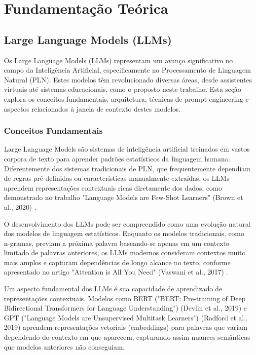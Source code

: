 \documentclass[tcc,capa]{texufpel}
\begin{document}
\chapter{Fundamentação Teórica}

\section{Large Language Models (LLMs)}

Os Large Language Models (LLMs) representam um avanço significativo no campo da Inteligência Artificial, especificamente no Processamento de Linguagem Natural (PLN). Estes modelos têm revolucionado diversas áreas, desde assistentes virtuais até sistemas educacionais, como o proposto neste trabalho. Esta seção explora os conceitos fundamentais, arquitetura, técnicas de prompt engineering e aspectos relacionados à janela de contexto destes modelos.

\subsection{Conceitos Fundamentais}

Large Language Models são sistemas de inteligência artificial treinados em vastos corpora de texto para aprender padrões estatísticos da linguagem humana. Diferentemente dos sistemas tradicionais de PLN, que frequentemente dependiam de regras pré-definidas ou características manualmente extraídas, os LLMs aprendem representações contextuais ricas diretamente dos dados, como demonstrado no trabalho "Language Models are Few-Shot Learners" (Brown et al., 2020) \cite{brown2020language}.

O desenvolvimento dos LLMs pode ser compreendido como uma evolução natural dos modelos de linguagem estatísticos. Enquanto os modelos tradicionais, como n-gramas, previam a próxima palavra baseando-se apenas em um contexto limitado de palavras anteriores, os LLMs modernos consideram contextos muito mais amplos e capturam dependências de longo alcance no texto, conforme apresentado no artigo "Attention is All You Need" (Vaswani et al., 2017) \cite{vaswani2017attention}.

Um aspecto fundamental dos LLMs é sua capacidade de aprendizado de representações contextuais. Modelos como BERT ("BERT: Pre-training of Deep Bidirectional Transformers for Language Understanding") (Devlin et al., 2019) \cite{devlin2019bert} e GPT ("Language Models are Unsupervised Multitask Learners") (Radford et al., 2019) \cite{radford2019language} aprendem representações vetoriais (embeddings) para palavras que variam dependendo do contexto em que aparecem, capturando assim nuances semânticas que modelos anteriores não conseguiam.
\end{document}

